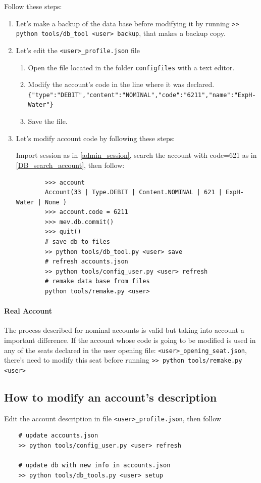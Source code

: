 \documentclass[12pt, a4paper]{article}
\begin{document}
Follow these steps:
\begin{enumerate}
	\item Let's make a backup of the data base before modifying it by running 
	\verb!>> python tools/db_tool <user> backup!, that makes a backup copy.
	\item Let's edit the \verb!<user>_profile.json! file
	\begin{enumerate}
		\item Open the file  located in the folder \verb!configfiles! with a text editor.
		\item Modify the account's code in the line where it was declared. \\
		\verb!{"type":"DEBIT","content":"NOMINAL","code":"6211","name":"ExpH-Water"}!
		\item Save the file.
	\end{enumerate}
	\item Let's modify account code by following these steps:
	
	Import session as in \ref{admin_session}, search the account with code=621 as in \ref{DB_search_account}, then follow:
	\begin{verbatim}
		>>> account
		Account(33 | Type.DEBIT | Content.NOMINAL | 621 | ExpH-Water | None )
		>>> account.code = 6211
		>>> mev.db.commit()
		>>> quit()
		# save db to files
		>> python tools/db_tool.py <user> save
		# refresh accounts.json
		>> python tools/config_user.py <user> refresh
		# remake data base from files
		python tools/remake.py <user>
	\end{verbatim}
\end{enumerate}
\paragraph{Real Account}  
The process described for nominal accounts is valid but taking into account a important difference.
If the account whose code is going to be modified is used in any of the seats declared in the user opening file: \verb!<user>_opening_seat.json!, there's  need to modify this seat  before running \verb!>> python tools/remake.py <user>!

\subsection{How to modify an account's description}
Edit the account description in file \verb!<user>_profile.json!, then follow
\begin{verbatim}
	# update accounts.json
	>> python tools/config_user.py <user> refresh
	
	# update db with new info in accounts.json
	>> python tools/db_tools.py <user> setup
\end{verbatim}
\end{document}
